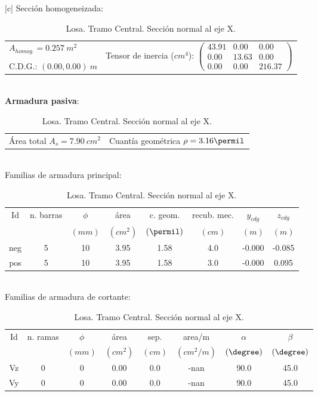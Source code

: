 \begin{table}
\begin{center}
\begin{tabular}{|c|}
\hline
Sección homogeneizada:\\
\hline
\begin{tabular}{ll}
$A_{homog.}= 0.257\ m^2$ & \multirow{3}{*}{Tensor de inercia ($cm^4$): $ \left( \begin{array}{ccc}43.91 & 0.00 & 0.00 \\ 0.00 & 13.63 &  0.00 \\ 0.00 &  0.00 & 216.37 \end{array} \right)$} \\
& \\
C.D.G.: $( 0.00, 0.00)\ m$  & \\
\end{tabular} \\
\hline
\textbf{Armadura pasiva}:\\
\hline
\begin{tabular}{ll}
Área total $A_s= 7.90\ cm^2$ & Cuantía geométrica $\rho= 3.16\permil$\\
\end{tabular} \\
\hline
Familias de armadura principal:\\
\hline
\begin{tabular}{cccccccc}
Id & n. barras & $\phi$ & área & c. geom. & recub. mec. & $y_{cdg}$ & $z_{cdg}$\\
 &  & $(mm)$ & $(cm^2)$ & $(\permil)$ & $(cm)$ & $(m)$ & $(m)$\\
\hline
neg & 5 & 10 &  3.95 & 1.58 &  4.0 & -0.000 & -0.085\\
\hline
pos & 5 & 10 &  3.95 & 1.58 &  3.0 & -0.000 & 0.095\\
\end{tabular} \\
\hline
Familias de armadura de cortante:\\
\hline
\begin{tabular}{cccccccc}
Id & n. ramas & $\phi$ & área & sep. & area/m & $\alpha$ & $\beta$\\
 &  & $(mm)$ & $(cm^2)$ & $(cm)$ & $(cm^2/m)$ & $( \degree)$ & $( \degree)$\\
\hline
Vz & 0 & 0 &  0.00 &  0.0 &  -nan & 90.0 & 45.0\\
\hline
Vy & 0 & 0 &  0.00 &  0.0 &  -nan & 90.0 & 45.0\\
\end{tabular} \\
\hline
\end{tabular}
\end{center}
\caption{Losa. Tramo Central. Sección normal al eje X.} \label{tb_secHA1LosC}
\end{table}

